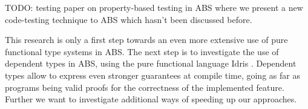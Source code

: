 TODO: testing paper on property-based testing in ABS where we present a new code-testing technique to ABS which hasn't been discussed before.

This research is only a first step towards an even more extensive use of pure functional type systems in ABS. The next step is to investigate the use of dependent types in ABS, using the pure functional language Idris \cite{brady_idris_2013}. Dependent types allow to express even stronger guarantees at compile time, going as far as programs being valid proofs for the correctness of the implemented feature. Further we want to investigate additional ways of speeding up our approaches.